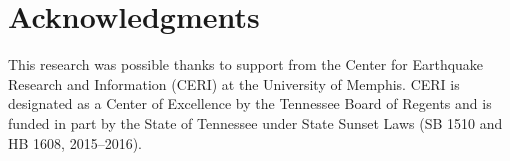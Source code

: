 
\section{Acknowledgments}

This research was possible thanks to support from the Center for Earthquake Research and Information (CERI) at the University of Memphis. CERI is designated as a Center of Excellence by the Tennessee Board of Regents and is funded in part by the State of Tennessee under State Sunset Laws (SB 1510 and HB 1608, 2015--2016).
